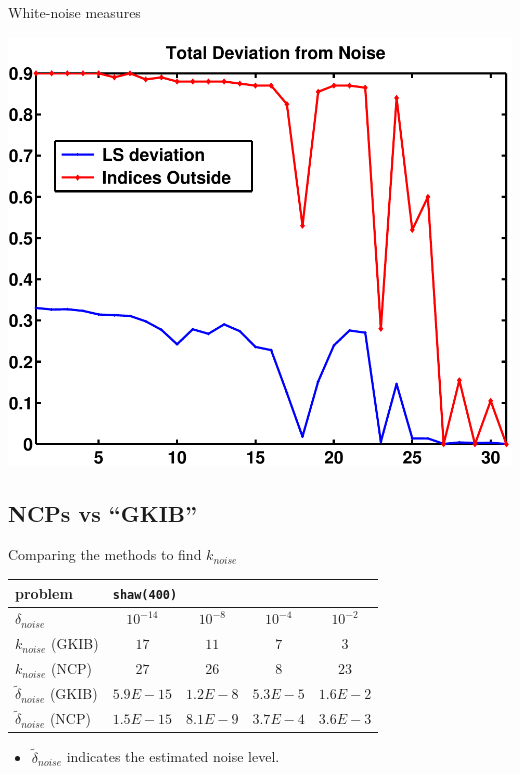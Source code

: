 \documentclass{beamer}
\begin{document}
\begin{frame}{White-noise measures}
  \begin{center}
    \includegraphics[width=0.55\linewidth]{figures/run1/total_deviation}
  \end{center}
\end{frame}

\subsection{NCPs vs ``GKIB''}
\begin{frame}{Comparing the methods to find $k_{noise}$}
  \begin{center}
    \begin{tabular}{l||c|c|c|c}
      \multicolumn{1}{l||}{problem} & \multicolumn{4}{l}{\texttt{shaw(400)}} \\
      \hline \hline 
      $\delta_{noise}$ & $10^{-14}$ & $10^{-8}$ & $10^{-4}$ & $10^{-2}$ \\
      \hline
      $k_{noise}$ (GKIB) & $17$ & $11$ & $7$ & $3$ \\
      \hline
      $k_{noise}$ (NCP) & $27$ & $26$ & $8$ & $23$ \\
      \hline
      $\tilde{\delta}_{noise}$ (GKIB) & $5.9E-15$ & $1.2E-8$ & $5.3E-5$ &
      $1.6E-2$ \\
      \hline
      $\tilde{\delta}_{noise}$ (NCP) & $1.5E-15$ & $8.1E-9$ & $3.7E-4$ & 
      $3.6E-3$ \\
    \end{tabular}
  \end{center}
  \begin{itemize}
    \item $\tilde{\delta}_{noise}$ indicates the estimated noise level.
    \end{itemize}
\end{frame}
\end{document}
